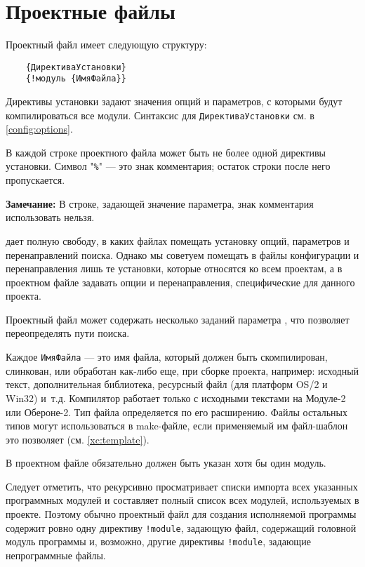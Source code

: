 \section{Проектные файлы}\label{xc:project}

Проектный файл имеет следующую структуру:
\begin{verbatim}
    {ДирективаУстановки}
    {!модуль {ИмяФайла}}
\end{verbatim}
Директивы установки задают значения опций и параметров,
с которыми будут компилироваться все модули.
Синтаксис для {\tt ДирективаУстановки} см. в \ref{config:options}.

В каждой строке проектного файла может быть не более одной директивы
установки.
Символ "\verb|%|" --- это знак комментария; остаток строки после
него пропускается.

{\bf Замечание:} В строке, задающей значение параметра, знак комментария
использовать нельзя.

\xds{} дает полную свободу, в каких файлах помещать установку
опций, параметров и перенаправлений поиска. Однако мы советуем
помещать в файлы конфигурации и перенаправления лишь те установки,
которые относятся ко всем проектам, а в проектном файле задавать
опции и перенаправления, специфические для данного проекта.

Проектный файл может содержать несколько 
заданий параметра , что позволяет переопределять
пути поиска.

Каждое {\tt ИмяФайла} --- это имя файла, который должен быть
скомпилирован, слинкован, или обработан как-либо еще, при сборке
проекта, например: исходный текст, дополнительная библиотека,
ресурсный файл (для платформ OS/2 и Win32) и~т.д.
Компилятор работает только с исходными текстами на Модуле-2 или
Обероне-2. Тип файла определяется по его расширению.
Файлы остальных типов могут использоваться в make-файле, если
применяемый им файл-шаблон это позволяет (см. \ref{xc:template}).


В проектном файле обязательно должен быть указан хотя бы один модуль.

Следует отметить, что \xds{} рекурсивно просматривает списки импорта
всех указанных программных модулей и составляет полный список всех модулей,
используемых в проекте. Поэтому обычно проектный файл для создания
исполняемой программы содержит ровно одну директиву {\tt !module},
задающую файл, содержащий головной модуль программы и, возможно,
другие директивы {\tt !module}, задающие непрограммные файлы.

